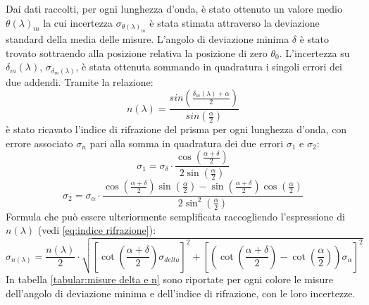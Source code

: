 \documentclass{article}
\begin{document}
        Dai dati raccolti, per ogni lunghezza d'onda, è stato ottenuto un valore medio $\theta(\lambda)_m$ la cui incertezza $\sigma_{\theta(\lambda)_m}$ 
        è stata stimata attraverso la deviazione standard della media delle misure. L'angolo di deviazione minima $\delta$ è stato trovato sottraendo 
        alla posizione relativa la posizione di zero $\theta_0$. L'incertezza su $\delta_m(\lambda)$, $\sigma_{\delta_m(\lambda)}$, è stata ottenuta sommando 
        in quadratura i singoli errori dei due addendi. Tramite la relazione:
        \begin{equation}\label{eq:indice rifrazione}
            n(\lambda) = \frac{sin(\frac{\delta_m(\lambda) + \alpha}{2})}{sin(\frac{\alpha}{2})}
        \end{equation}
        è stato ricavato l'indice di rifrazione del prisma per ogni lunghezza d'onda, con errore associato $\sigma_n$ pari alla somma in quadratura 
        dei due errori $\sigma_1$ e $\sigma_2$:
        \[\sigma_1 = \sigma_{\delta} \cdot \frac{\cos(\frac{\alpha + \delta}{2})}{2\sin(\frac{\alpha}{2})} \]
        \[\sigma_2 = \sigma_{\alpha}\cdot \frac{\cos(\frac{\alpha + \delta}{2})\sin(\frac{\alpha}{2}) - 
                    \sin(\frac{\alpha + \delta}{2})\cos(\frac{\alpha}{2})}{2\sin^2(\frac{\alpha}{2})} \]
        Formula che può essere ulteriormente semplificata raccogliendo l'espressione di $n(\lambda)$ (vedi \ref{eq:indice rifrazione}):
        \[
        \sigma_{n(\lambda)}= \frac{n(\lambda)}{2} \cdot \sqrt{[\cot(\frac{\alpha + \delta}{2})\sigma_{delta}]^2 + [(\cot(\frac{\alpha + \delta}{2})-\cot(\frac{\alpha}{2}))\sigma_{\alpha}]^2}
        \]
        In tabella \ref{tabular:misure delta e n} sono riportate per ogni colore le misure dell'angolo di deviazione minima e dell'indice di rifrazione, con le loro incertezze.    
\end{document}
